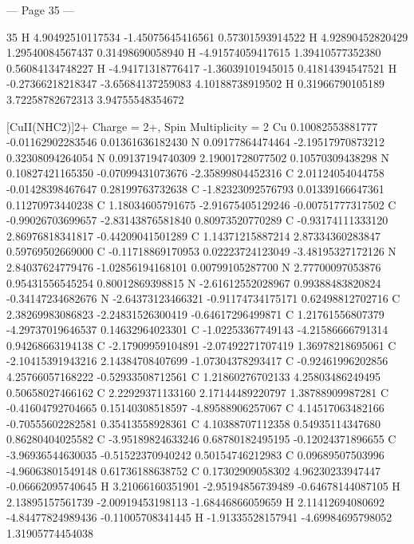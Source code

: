 \documentclass{article}
\begin{document}
--- Page 35 ---
 
35 
  H   4.90492510117534     -1.45075645416561      0.57301593914522 
  H   4.92890452820429      1.29540084567437      0.31498690058940 
  H   -4.91574059417615      1.39410577352380      0.56084134748227 
  H   -4.94171318776417     -1.36039101945015      0.41814394547521 
  H   -0.27366218218347     -3.65684137259083      4.10188738919502 
  H   0.31966790105189      3.72258782672313      3.94755548354672 
 
[CuII(NHC2)]2+ 
Charge = 2+, Spin Multiplicity = 2 
  Cu  0.10082553881777     -0.01162902283546      0.01361636182430 
  N   0.09177864474464     -2.19517970873212      0.32308094264054 
  N   0.09137194740309      2.19001728077502      0.10570309438298 
  N   0.10827421165350     -0.07099431073676     -2.35899804452316 
  C   2.01124054044758     -0.01428398467647      0.28199763732638 
  C   -1.82323092576793      0.01339166647361      0.11270973440238 
  C   1.18034605791675     -2.91675405129246     -0.00751777317502 
  C   -0.99026703699657     -2.83143876581840      0.80973520770289 
  C   -0.93174111333120      2.86976818341817     -0.44209041501289 
  C   1.14371215887214      2.87334360283847      0.59769502669000 
  C   -0.11718869170953      0.02223724123049     -3.48195327172126 
  N   2.84037624779476     -1.02856194168101      0.00799105287700 
  N   2.77700097053876      0.95431556545254      0.80012869398815 
  N   -2.61612552028967      0.99388483820824     -0.34147234682676 
  N   -2.64373123466321     -0.91174734175171      0.62498812702716 
  C   2.38269983086823     -2.24831526300419     -0.64617296499871 
  C   1.21761556807379     -4.29737019646537      0.14632964023301 
  C   -1.02253367749143     -4.21586666791314      0.94268663194138 
  C   -2.17909959104891     -2.07492271707419      1.36978218695061 
  C   -2.10415391943216      2.14384708407699     -1.07304378293417 
  C   -0.92461996202856      4.25766057168222     -0.52933508712561 
  C   1.21860276702133      4.25803486249495      0.50658027466162 
  C   2.22929371133160      2.17144489220797      1.38788909987281 
  C   -0.41604792704665      0.15140308518597     -4.89588906257067 
  C   4.14517063482166     -0.70555602282581      0.35413558928361 
  C   4.10388707112358      0.54935114347680      0.86280404025582 
  C   -3.95189824633246      0.68780182495195     -0.12024371896655 
  C   -3.96936544630035     -0.51522370940242      0.50154746212983 
  C   0.09689507503996     -4.96063801549148      0.61736188638752 
  C   0.17302909058302      4.96230233947447     -0.06662095740645 
  H   3.21066160351901     -2.95194856739489     -0.64678144087105 
  H   2.13895157561739     -2.00919453198113     -1.68446866059659 
  H   2.11412694080692     -4.84477824989436     -0.11005708341445 
  H   -1.91335528157941     -4.69984695798052      1.31905774454038 
\end{document}
